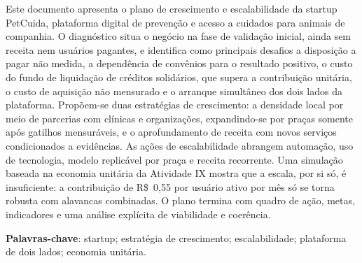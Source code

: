 \begin{resumo}[RESUMO]
\begin{SingleSpace}
\noindent Este documento apresenta o plano de crescimento e escalabilidade da startup PetCuida, plataforma digital de prevenção e acesso a cuidados para animais de companhia. O diagnóstico situa o negócio na fase de validação inicial, ainda sem receita nem usuários pagantes, e identifica como principais desafios a disposição a pagar não medida, a dependência de convênios para o resultado positivo, o custo do fundo de liquidação de créditos solidários, que supera a contribuição unitária, o custo de aquisição não mensurado e o arranque simultâneo dos dois lados da plataforma. Propõem-se duas estratégias de crescimento: a densidade local por meio de parcerias com clínicas e organizações, expandindo-se por praças somente após gatilhos mensuráveis, e o aprofundamento de receita com novos serviços condicionados a evidências. As ações de escalabilidade abrangem automação, uso de tecnologia, modelo replicável por praça e receita recorrente. Uma simulação baseada na economia unitária da Atividade IX mostra que a escala, por si só, é insuficiente: a contribuição de R\$~0,55 por usuário ativo por mês só se torna robusta com alavancas combinadas. O plano termina com quadro de ação, metas, indicadores e uma análise explícita de viabilidade e coerência.

\vspace{\onelineskip}
\noindent\textbf{Palavras-chave}: startup; estratégia de crescimento; escalabilidade; plataforma de dois lados; economia unitária.
\end{SingleSpace}
\end{resumo}
